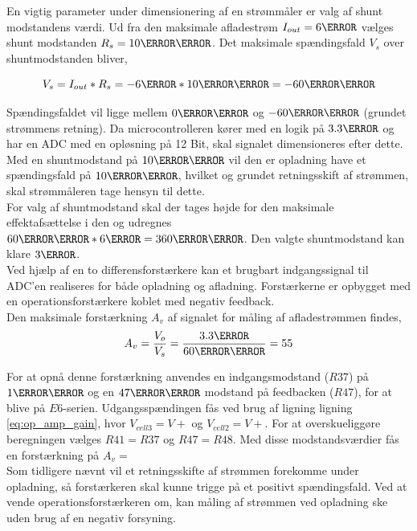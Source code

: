 En vigtig parameter under dimensionering af en strømmåler er valg af shunt modstandens værdi. Ud fra den maksimale afladestrøm $I_{out} = 6\ampere$ vælges shunt modstanden $R_{s} = 10\milli\ohm$. Det maksimale spændingsfald $V_{s}$ over shuntmodstanden bliver,

\begin {equation} 
V_{s} = I_{out} * R_{s}  = -6\ampere * 10\milli\ohm = -60\milli\volt
\end {equation}

Spændingsfaldet vil ligge mellem $0\milli\volt$ og $-60\milli\volt$ (grundet strømmens retning). Da microcontrolleren kører med en logik på $3.3\volt$ og har en ADC med en opløsning på 12 Bit, skal signalet dimensioneres efter dette. Med en shuntmodstand på $10\milli\ohm$ vil den er opladning have et spændingsfald på $10\milli\volt$, hvilket og grundet retningsskift af strømmen, skal strømmåleren tage hensyn til dette.
\\
For valg af shuntmodstand skal der tages højde for den maksimale effektafsættelse i den og udregnes $60\milli\volt * 6\ampere = 360\milli\watt$. Den valgte shuntmodstand kan klare $3\watt$.
\\

Ved hjælp af en to differensforstærkere kan et brugbart indgangssignal til ADC'en realiseres for både opladning og afladning. Forstærkerne er opbygget med en operationsforstærkere koblet med negativ feedback.
\\

Den maksimale forstærkning $A_{v}$ af signalet for måling af afladestrømmen findes,
\begin {equation} 
A_{v} = \frac{V_{o}}{V_{s}} = \frac{3.3\volt}{60\milli\volt} = 55
\end {equation}

For at opnå denne forstærkning anvendes en indgangsmodstand ($R37$) på $1\kilo\ohm$ og en $47\kilo\ohm$ modstand på feedbacken ($R47$), for at blive på $E6$-serien. Udgangsspændingen fås ved brug af ligning ligning \ref{eq:op_amp_gain}, hvor $V_{cell3} = V+$ og $V_{cell2} = V+$. For at overskueliggøre beregningen vælges $R41 = R37$ og $R47 = R48$. Med disse modstandsværdier fås en forstærkning på $A_{v} = $
\\
Som tidligere nævnt vil et retningsskifte af strømmen forekomme under opladning, så forstærkeren skal kunne trigge på et positivt spændingsfald. Ved at vende operationsforstærkeren om, kan måling af strømmen ved opladning ske uden brug af en negativ forsyning.
\\

